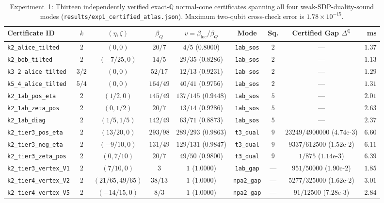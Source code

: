\documentclass[11pt,a4paper]{article}
\newcommand{\QQ}{\mathbb{Q}}
\begin{document}
\begin{table}[t]
\centering
\caption{Experiment~1: Thirteen independently verified exact-$\QQ$ normal-cone certificates spanning all four weak-SDP-duality-sound modes (\texttt{results/exp1\_certified\_atlas.json}). Maximum two-qubit cross-check error is $1.78 \times 10^{-15}$.}
\label{tab:atlas}
\scriptsize
\setlength{\tabcolsep}{3.5pt}
\begin{tabular}{@{}lcccccccr@{}}
\toprule
Certificate ID & $k$ & $(\eta, \zeta)$ & $\beta_Q$ & $v = \beta_{\mathrm{loc}}/\beta_Q$ & Mode & Sq. & Certified Gap $\Delta^{\QQ}$ & ms \\
\midrule
\texttt{k2\_alice\_tilted} & $2$ & $(0, 0)$ & $20/7$ & $4/5$ ($0.8000$) & \texttt{1ab\_sos} & $2$ & --- & $1.37$ \\
\texttt{k2\_bob\_tilted} & $2$ & $(-7/25, 0)$ & $14/5$ & $29/35$ ($0.8286$) & \texttt{1ab\_sos} & $2$ & --- & $1.13$ \\
\texttt{k3\_2\_alice\_tilted} & $3/2$ & $(0, 0)$ & $52/17$ & $12/13$ ($0.9231$) & \texttt{1ab\_sos} & $2$ & --- & $1.29$ \\
\texttt{k5\_4\_alice\_tilted} & $5/4$ & $(0, 0)$ & $164/49$ & $40/41$ ($0.9756$) & \texttt{1ab\_sos} & $2$ & --- & $1.31$ \\
\texttt{k2\_1ab\_pos\_eta} & $2$ & $(1/2, 0)$ & $145/49$ & $137/145$ ($0.9448$) & \texttt{1ab\_sos} & $5$ & --- & $2.01$ \\
\texttt{k2\_1ab\_zeta\_pos} & $2$ & $(0, 1/2)$ & $20/7$ & $13/14$ ($0.9286$) & \texttt{1ab\_sos} & $5$ & --- & $2.63$ \\
\texttt{k2\_1ab\_diag} & $2$ & $(1/5, 1/5)$ & $142/49$ & $63/71$ ($0.8873$) & \texttt{1ab\_sos} & $5$ & --- & $2.37$ \\
\texttt{k2\_tier3\_pos\_eta} & $2$ & $(13/20, 0)$ & $293/98$ & $289/293$ ($0.9863$) & \texttt{t3\_dual} & $9$ & $23249/4900000$ ($4.74\text{e-}3$) & $6.60$ \\
\texttt{k2\_tier3\_neg\_eta} & $2$ & $(-9/10, 0)$ & $131/49$ & $129/131$ ($0.9847$) & \texttt{t3\_dual} & $9$ & $9337/612500$ ($1.52\text{e-}2$) & $6.11$ \\
\texttt{k2\_tier3\_zeta\_pos} & $2$ & $(0, 7/10)$ & $20/7$ & $49/50$ ($0.9800$) & \texttt{t3\_dual} & $9$ & $1/875$ ($1.14\text{e-}3$) & $6.39$ \\
\texttt{k2\_tier3\_vertex\_V1} & $2$ & $(7/10, 0)$ & $3$ & $1$ ($1.0000$) & \texttt{1ab\_gap} & --- & $951/50000$ ($1.90\text{e-}2$) & $1.85$ \\
\texttt{k2\_tier4\_vertex\_V2} & $2$ & $(21/65, 49/65)$ & $38/13$ & $1$ ($1.0000$) & \texttt{npa2\_gap} & --- & $5277/325000$ ($1.62\text{e-}2$) & $3.01$ \\
\texttt{k2\_tier4\_vertex\_V5} & $2$ & $(-14/15, 0)$ & $8/3$ & $1$ ($1.0000$) & \texttt{npa2\_gap} & --- & $91/12500$ ($7.28\text{e-}3$) & $2.84$ \\
\bottomrule
\end{tabular}
\end{table}
\end{document}
